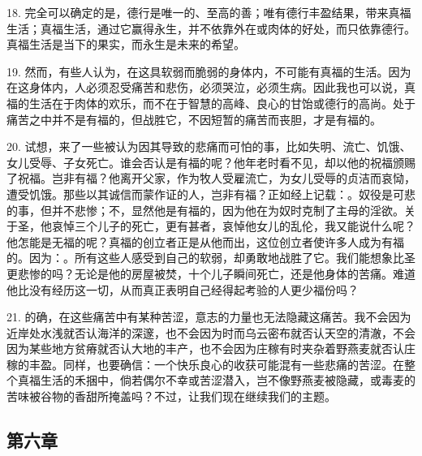 18. 完全可以确定的是，德行是唯一的、至高的善；唯有德行丰盈结果，带来真福生活；真福生活，通过它赢得永生，并不依靠外在或肉体的好处，而只依靠德行。真福生活是当下的果实，而永生是未来的希望。\par

19. 然而，有些人认为，在这具软弱而脆弱的身体内，不可能有真福的生活。因为在这身体内，人必须忍受痛苦和悲伤，必须哭泣，必须生病。因此我也可以说，真福的生活在于肉体的欢乐，而不在于智慧的高峰、良心的甘饴或德行的高尚。处于痛苦之中并不是有福的，但战胜它，不因短暂的痛苦而丧胆，才是有福的。\par

20. 试想，来了一些被认为因其导致的悲痛而可怕的事，比如失明、流亡、饥饿、女儿受辱、子女死亡。谁会否认是有福的呢？他年老时看不见，却以他的祝福颁赐了祝福。岂非有福？他离开父家，作为牧人受雇流亡，为女儿受辱的贞洁而哀恸，遭受饥饿。那些以其诚信而蒙作证的人，岂非有福？正如经上记载：。奴役是可悲的事，但并不悲惨；不，显然他是有福的，因为他在为奴时克制了主母的淫欲。关于圣，他哀悼三个儿子的死亡，更有甚者，哀悼他女儿的乱伦，我又能说什么呢？他怎能是无福的呢？真福的创立者正是从他而出，这位创立者使许多人成为有福的。因为：。所有这些人感受到自己的软弱，却勇敢地战胜了它。我们能想象比圣更悲惨的吗？无论是他的房屋被焚，十个儿子瞬间死亡，还是他身体的苦痛。难道他比没有经历这一切，从而真正表明自己经得起考验的人更少福份吗？\par

21. 的确，在这些痛苦中有某种苦涩，意志的力量也无法隐藏这痛苦。我不会因为近岸处水浅就否认海洋的深邃，也不会因为时而乌云密布就否认天空的清澈，不会因为某些地方贫瘠就否认大地的丰产，也不会因为庄稼有时夹杂着野燕麦就否认庄稼的丰盈。同样，也要确信：一个快乐良心的收获可能混有一些悲痛的苦涩。在整个真福生活的禾捆中，倘若偶尔不幸或苦涩潜入，岂不像野燕麦被隐藏，或毒麦的苦味被谷物的香甜所掩盖吗？不过，让我们现在继续我们的主题。\par


\subsection{第六章}

